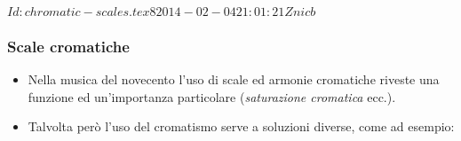 %
%
\svnInfo $Id: chromatic-scales.tex 8 2014-02-04 21:01:21Z nicb $

\begin{frame}
    \frametitle{Scale cromatiche}

    \begin{itemize}

        \item Nella musica del novecento l'uso di scale ed armonie
            cromatiche riveste una funzione ed un'importanza
            particolare (\emph{saturazione cromatica} ecc.).

        \item Talvolta per\`o l'uso del cromatismo
            serve a soluzioni diverse, come ad esempio:

            \begin{center}
                \begin{figure}
                    \caption{}
                \end{figure}
            \end{center}

    \end{itemize}

\end{frame}

